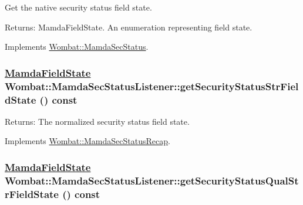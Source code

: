 Get the native security status field state. 

\begin{Desc}
\item[Returns:]Mamda\-Field\-State. An enumeration representing field state. \end{Desc}


Implements \hyperlink{classWombat_1_1MamdaSecStatus_e12cf50355eda32ff167910636c5629f}{Wombat::Mamda\-Sec\-Status}.\hypertarget{classWombat_1_1MamdaSecStatusListener_3ab7eddbc0cb17286b8d14330470a927}{
\subsubsection[getSecurityStatusStrFieldState]{\setlength{\rightskip}{0pt plus 5cm}\hyperlink{namespaceWombat_93aac974f2ab713554fd12a1fa3b7d2a}{Mamda\-Field\-State} Wombat::Mamda\-Sec\-Status\-Listener::get\-Security\-Status\-Str\-Field\-State () const}}
\label{classWombat_1_1MamdaSecStatusListener_3ab7eddbc0cb17286b8d14330470a927}


\begin{Desc}
\item[Returns:]The normalized security status field state. \end{Desc}


Implements \hyperlink{classWombat_1_1MamdaSecStatusRecap_f95c229e668def717ef05e1d8dc746ce}{Wombat::Mamda\-Sec\-Status\-Recap}.\hypertarget{classWombat_1_1MamdaSecStatusListener_31cde3bb8da5542a23a39227caa7106a}{
\subsubsection[getSecurityStatusQualStrFieldState]{\setlength{\rightskip}{0pt plus 5cm}\hyperlink{namespaceWombat_93aac974f2ab713554fd12a1fa3b7d2a}{Mamda\-Field\-State} Wombat::Mamda\-Sec\-Status\-Listener::get\-Security\-Status\-Qual\-Str\-Field\-State () const}}
\label{classWombat_1_1MamdaSecStatusListener_31cde3bb8da5542a23a39227caa7106a}


